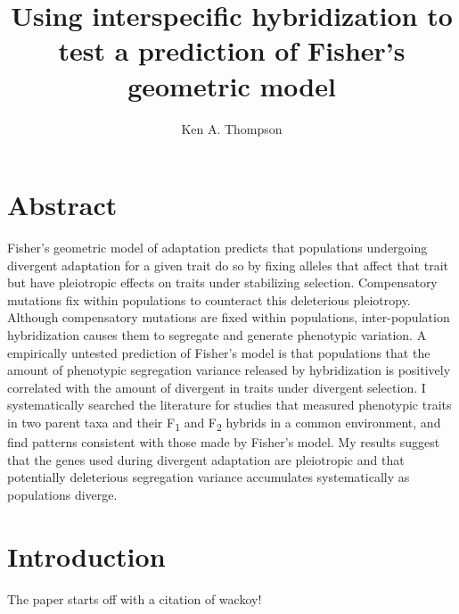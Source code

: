 \documentclass{article}
\begin{document}
\title{Using interspecific hybridization to test a prediction of Fisher's geometric model}
\author{Ken A. Thompson}

\maketitle


% 
% 


\section{Abstract}

Fisher's geometric model of adaptation predicts that populations undergoing divergent adaptation for a
given trait do so by fixing alleles that affect that trait but have pleiotropic effects on traits under
stabilizing selection. Compensatory mutations fix within populations to counteract this deleterious
pleiotropy. Although compensatory mutations are fixed within populations, inter-population hybridization
causes them to segregate and generate phenotypic variation. A empirically untested prediction of
Fisher's model is that populations that the amount of phenotypic segregation variance released by
hybridization is positively correlated with the amount of divergent in traits under divergent selection.
I systematically searched the literature for studies that measured phenotypic traits in two parent taxa
and their F\textsubscript{1} and F\textsubscript{2} hybrids in a common environment, and find patterns
consistent with those made by Fisher's model. My results suggest that the genes used during divergent
adaptation are pleiotropic and that potentially deleterious segregation variance accumulates systematically as populations diverge.


\newpage

\section{Introduction}

The paper starts off with a citation of \cite{Thompson2015} wackoy!



\end{document}
